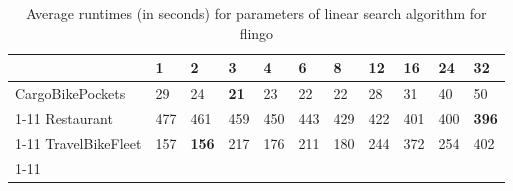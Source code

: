 \begin{table}[ht]
\centering
\caption{Average runtimes (in seconds) for  parameters of linear search algorithm for flingo}
\label{tab:results:linear}
\begin{tabular}{l|llllllllll}
\toprule
 & 1 & 2 & 3 & 4 & 6 & 8 & 12 & 16 & 24 & 32 \\
\midrule
CargoBikePockets & 29 & 24 & \textbf{21} & 23 & 22 & 22 & 28 & 31 & 40 & 50 \\
\cline{1-11}
Restaurant & 477 & 461 & 459 & 450 & 443 & 429 & 422 & 401 & 400 & \textbf{396} \\
\cline{1-11}
TravelBikeFleet & 157 & \textbf{156} & 217 & 176 & 211 & 180 & 244 & 372 & 254 & 402 \\
\cline{1-11}
\bottomrule
\end{tabular}
\end{table}
